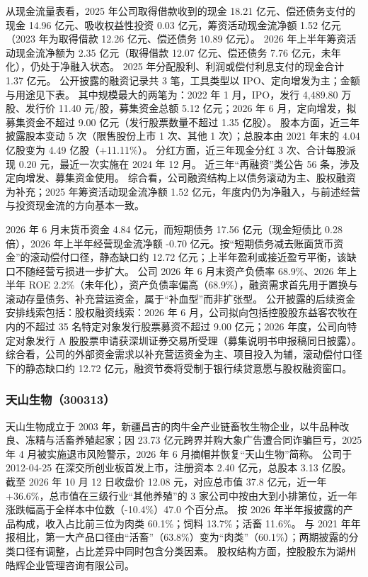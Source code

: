  从现金流量表看，2025 年公司取得借款收到的现金 18.21 亿元、偿还债务支付的现金 14.96 亿元、吸收权益性投资 0.03 亿元，筹资活动现金流净额 1.52 亿元（2023 年为取得借款 12.26 亿元、偿还债务 10.89 亿元）。 2026 年上半年筹资活动现金流净额为 2.35 亿元（取得借款 12.07 亿元、偿还债务 7.76 亿元，未年化），仍处于净融入状态。 2025 年分配股利、利润或偿付利息支付的现金合计 1.37 亿元。 公开披露的融资记录共 3 笔，工具类型以 IPO、定向增发为主；金额与用途见下表。 其中规模最大的两笔为：2022 年 1 月，IPO，发行 4,489.80 万股、发行价 11.40 元/股，募集资金总额 5.12 亿元；2026 年 6 月，定向增发，拟募集资金不超过 9.00 亿元（发行股票数量不超过 1.35 亿股）。 股本方面，近三年披露股本变动 5 次（限售股份上市 1 次、其他 1 次）；总股本由 2021 年末的 4.04 亿股变为 4.49 亿股（+11.11\%）。 分红方面，近三年现金分红 3 次、合计每股派现 0.20 元，最近一次实施在 2024 年 12 月。 近三年“再融资”类公告 56 条，涉及定向增发、募集资金使用。 综合看，公司融资结构上以债务滚动为主、股权融资为补充；2025 年筹资活动现金流净额 1.52 亿元，年度内仍为净融入，与前述经营与投资现金流的方向基本一致。

 2026 年 6 月末货币资金 4.84 亿元，而短期债务 17.56 亿元（现金短债比 0.28 倍），2026 年上半年经营现金流净额 -0.70 亿元。按“短期债务减去账面货币资金”的滚动偿付口径，静态缺口约 12.72 亿元；上半年盈利或接近盈亏平衡，该缺口不随经营亏损进一步扩大。 公司 2026 年 6 月末资产负债率 68.9\%、2026 年上半年 ROE 2.2\%（未年化），资产负债率偏高（68.9\%），融资需求首先用于置换与滚动存量债务、补充营运资金，属于“补血型”而非扩张型。 公开披露的后续资金安排线索包括：股权融资线索：2026 年 6 月，公司拟向包括控股股东益客农牧在内的不超过 35 名特定对象发行股票募资不超过 9.00 亿元；2026 年度，公司向特定对象发行 A 股股票申请获深圳证券交易所受理（募集说明书申报稿同日披露）。 综合看，公司的外部资金需求以补充营运资金为主、项目投入为辅，滚动偿付口径下的静态缺口约 12.72 亿元，融资节奏将受制于银行续贷意愿与股权融资窗口。




\subsubsection{天山生物（300313）}
\label{co:300313}

 天山生物成立于 2003 年，新疆昌吉的肉牛全产业链畜牧生物企业，以牛品种改良、冻精与活畜养殖起家；因 23.73 亿元跨界并购大象广告遭合同诈骗巨亏，2025 年 4 月被实施退市风险警示，2026 年 6 月摘帽并恢复“天山生物”简称。 公司于 2012-04-25 在深交所创业板首发上市，注册资本 2.40 亿元，总股本 3.13 亿股。 截至 2026 年 10 月 12 日收盘价 12.08 元，对应总市值 37.8 亿元，近一年+36.6\%，总市值在三级行业“其他养殖”的 3 家公司中按由大到小排第位，近一年涨跌幅高于全样本中位数（-10.4\%）47.0 个百分点。 按 2026 年半年报披露的产品构成，收入占比前三位为肉类 60.1\%；饲料 13.7\%；活畜 11.6\%。 与 2021 年年报相比，第一大产品口径由“活畜”（63.8\%）变为“肉类”（60.1\%）；两期披露的分类口径有调整，占比差异中同时包含分类因素。 股权结构方面，控股股东为湖州皓辉企业管理咨询有限公司。

